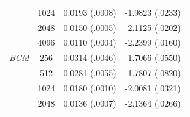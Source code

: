 \documentclass[11pt, oneside]{article}
\begin{document}
\begin{table}[tb]
\begin{tabular}{r|c|c c}
        & 1024 & 0.0193 (.0008) & -1.9823 (.0233) \\
        & 2048 & 0.0150 (.0005) & -2.1125 (.0202) \\
        & 4096 & 0.0110 (.0004) & -2.2399 (.0160) \\
        \hline
        \emph{BCM} & 256 & 0.0314 (.0046) & -1.7066 (.0550) \\
        & 512 & 0.0281 (.0055) & -1.7807 (.0820) \\
        & 1024 & 0.0180 (.0010) & -2.0081 (.0321) \\
        & 2048 & 0.0136 (.0007) & -2.1364 (.0266) \\
        \hline
    \end{tabular}

\end{table}


\end{document}
